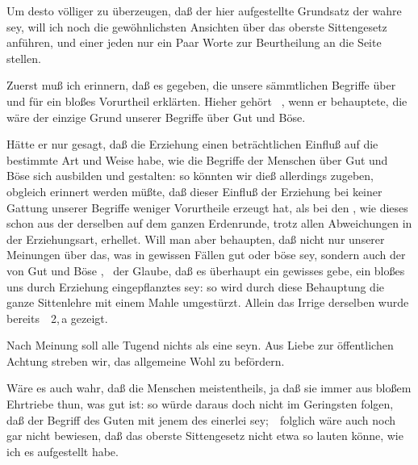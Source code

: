Um desto völliger zu überzeugen, daß der hier aufgestellte Grundsatz der wahre sey, will ich noch die gewöhnlichsten  Ansichten über das oberste Sittengesetz anführen, und einer jeden nur ein Paar Worte zur Beurtheilung an die Seite stellen.
\begin{aufza}
\item Zuerst muß ich erinnern, daß es  gegeben, die unsere sämmtlichen Begriffe über  und  für ein bloßes Vorurtheil erklärten. Hieher gehört \zB\ , wenn er behauptete, die  wäre der einzige Grund unserer Begriffe über Gut und Böse.
\end{aufza}\par
Hätte er nur gesagt, daß die Erziehung einen beträchtlichen Einfluß auf die bestimmte Art und Weise habe, wie die Begriffe der Menschen über Gut und Böse sich ausbilden und gestalten: so könnten wir dieß allerdings zugeben, obgleich erinnert werden müßte, daß dieser Einfluß der Erziehung bei keiner Gattung unserer Begriffe weniger Vorurtheile erzeugt hat, als bei den , wie dieses schon aus der  derselben auf dem ganzen Erdenrunde, trotz allen Abweichungen in der Erziehungsart, erhellet. Will man aber behaupten, daß nicht nur  unserer Meinungen über das, was in gewissen Fällen gut oder böse sey, sondern auch der  von Gut und Böse , \dh\ der Glaube, daß es überhaupt ein gewisses  gebe, ein bloßes uns durch Erziehung eingepflanztes  sey: so wird durch diese Behauptung die ganze Sittenlehre mit einem Mahle umgestürzt. Allein das Irrige derselben wurde bereits \ \no\,2,\,a gezeigt.
\begin{aufza}\setcounter{enumi}{1}
\item Nach  Meinung soll alle Tugend nichts als eine  seyn. Aus Liebe zur öffentlichen Achtung streben wir, das allgemeine Wohl zu befördern.
\end{aufza}\par
Wäre es auch wahr, daß die Menschen meistentheils, ja daß sie immer aus bloßem Ehrtriebe thun, was gut ist: so würde daraus doch nicht im Geringsten folgen, daß der Begriff des Guten mit jenem des  einerlei sey;~\ folglich wäre auch noch gar nicht bewiesen, daß das oberste Sittengesetz nicht etwa so lauten könne, wie ich es aufgestellt habe.
